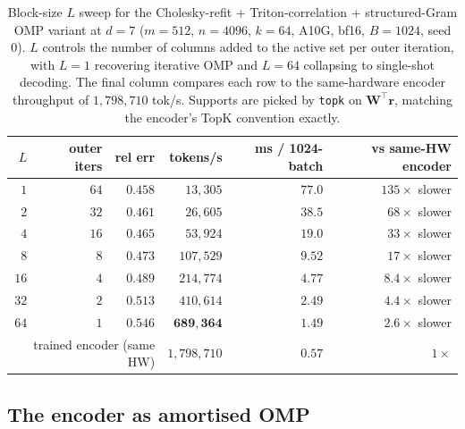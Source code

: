 \documentclass{article}
\theoremstyle{plain}
\theoremstyle{definition}
\theoremstyle{remark}
\begin{document}
\begin{table}[!htbp]
    \centering
    \caption{Block-size $L$ sweep for the Cholesky-refit + Triton-correlation + structured-Gram OMP variant at $d{=}7$ ($m{=}512$, $n{=}4096$, $k{=}64$, A10G, bf16, $B{=}1024$, seed 0). $L$ controls the number of columns added to the active set per outer iteration, with $L{=}1$ recovering iterative OMP and $L{=}64$ collapsing to single-shot decoding. The final column compares each row to the same-hardware encoder throughput of $1{,}798{,}710$ tok/s. Supports are picked by \texttt{topk} on $\mathbf{W}^\top \mathbf{r}$, matching the encoder's TopK convention exactly.}
    \label{tab:pareto_d7}
    \small
    \begin{tabular}{rrrrrr}
        \toprule
        $L$ & outer iters & rel err & tokens/s & ms / 1024-batch & vs same-HW encoder \\
        \midrule
        $1$  & $64$ & $0.458$ & $13{,}305$  & $77.0$  & $135\times$ slower  \\
        $2$  & $32$ & $0.461$ & $26{,}605$  & $38.5$  & $68\times$ slower   \\
        $4$  & $16$ & $0.465$ & $53{,}924$  & $19.0$  & $33\times$ slower   \\
        $8$  & $8$  & $0.473$ & $107{,}529$ & $9.52$  & $17\times$ slower   \\
        $16$ & $4$  & $0.489$ & $214{,}774$ & $4.77$  & $8.4\times$ slower  \\
        $32$ & $2$  & $0.513$ & $410{,}614$ & $2.49$  & $4.4\times$ slower  \\
        $64$ & $1$  & $0.546$ & $\mathbf{689{,}364}$ & $\mathbf{1.49}$ & $\mathbf{2.6\times}$ slower \\
        \midrule
        \multicolumn{3}{r}{trained encoder (same HW)} & $1{,}798{,}710$ & $0.57$ & $1\times$ \\
        \bottomrule
    \end{tabular}
\end{table}

\subsection{The encoder as amortised OMP}
\end{document}
